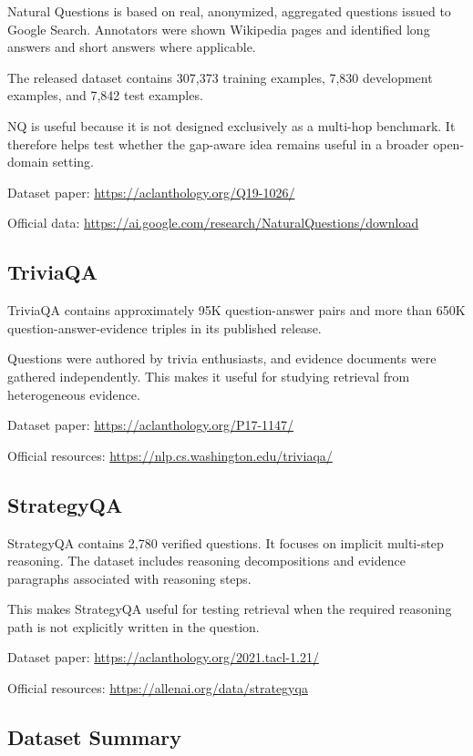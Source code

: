 \documentclass[11pt,a4paper]{article}
\begin{document}
Natural Questions is based on real, anonymized, aggregated questions issued to Google Search. Annotators were shown Wikipedia pages and identified long answers and short answers where applicable.

The released dataset contains 307,373 training examples, 7,830 development examples, and 7,842 test examples.

NQ is useful because it is not designed exclusively as a multi-hop benchmark. It therefore helps test whether the gap-aware idea remains useful in a broader open-domain setting.

Dataset paper:
\url{https://aclanthology.org/Q19-1026/}

Official data:
\url{https://ai.google.com/research/NaturalQuestions/download}

\subsection{TriviaQA}

TriviaQA contains approximately 95K question-answer pairs and more than 650K question-answer-evidence triples in its published release.

Questions were authored by trivia enthusiasts, and evidence documents were gathered independently. This makes it useful for studying retrieval from heterogeneous evidence.

Dataset paper:
\url{https://aclanthology.org/P17-1147/}

Official resources:
\url{https://nlp.cs.washington.edu/triviaqa/}

\subsection{StrategyQA}

StrategyQA contains 2,780 verified questions. It focuses on implicit multi-step reasoning. The dataset includes reasoning decompositions and evidence paragraphs associated with reasoning steps.

This makes StrategyQA useful for testing retrieval when the required reasoning path is not explicitly written in the question.

Dataset paper:
\url{https://aclanthology.org/2021.tacl-1.21/}

Official resources:
\url{https://allenai.org/data/strategyqa}

\subsection{Dataset Summary}
\end{document}
